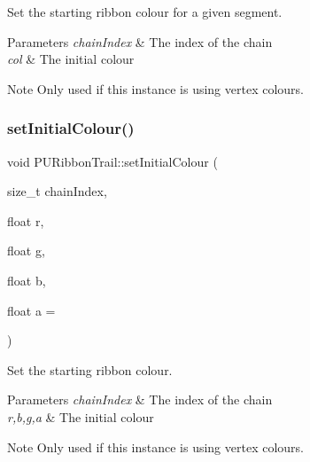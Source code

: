Set the starting ribbon colour for a given segment. 
\begin{DoxyParams}{Parameters}
{\em chain\+Index} & The index of the chain \\
\hline
{\em col} & The initial colour \\
\hline
\end{DoxyParams}
\begin{DoxyNote}{Note}
Only used if this instance is using vertex colours. 
\end{DoxyNote}
\mbox{\label{classPURibbonTrail_a358e7014b6eb2d7a3a3cbfaf28455e4f}} 
\subsubsection{\texorpdfstring{set\+Initial\+Colour()}{setInitialColour()}\hspace{0.1cm}{\footnotesize\ttfamily [3/4]}}
{\footnotesize\ttfamily void P\+U\+Ribbon\+Trail\+::set\+Initial\+Colour (\begin{DoxyParamCaption}\item[{size\+\_\+t}]{chain\+Index,  }\item[{float}]{r,  }\item[{float}]{g,  }\item[{float}]{b,  }\item[{float}]{a = {} }\end{DoxyParamCaption})\hspace{0.3cm}{\ttfamily [virtual]}}

Set the starting ribbon colour. 
\begin{DoxyParams}{Parameters}
{\em chain\+Index} & The index of the chain \\
\hline
{\em r,b,g,a} & The initial colour \\
\hline
\end{DoxyParams}
\begin{DoxyNote}{Note}
Only used if this instance is using vertex colours. 
\end{DoxyNote}
\mbox{\label{classPURibbonTrail_a812b6a2c2e50987e22e28a534f52fcf0}} 
